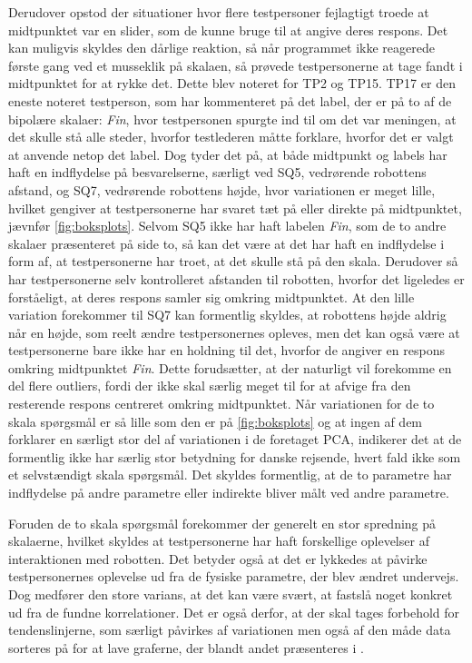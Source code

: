 Derudover opstod der situationer hvor flere testpersoner fejlagtigt troede at midtpunktet var en slider, som de kunne bruge til at angive deres respons. Det kan muligvis skyldes den dårlige reaktion, så når programmet ikke reagerede første gang ved et musseklik på skalaen, så prøvede testpersonerne at tage fandt i midtpunktet for at rykke det. Dette blev noteret for TP2 og TP15.\blankline 
%
TP17 er den eneste noteret testperson, som har kommenteret på det label, der er på to af de bipolære skalaer: \textit{Fin}, hvor testpersonen spurgte ind til om det var meningen, at det skulle stå alle steder, hvorfor testlederen måtte forklare, hvorfor det er valgt at anvende netop det label. Dog tyder det på, at både midtpunkt og labels har haft en indflydelse på besvarelserne, særligt ved SQ5, vedrørende robottens afstand, og SQ7, vedrørende robottens højde, hvor variationen er meget lille, hvilket gengiver at testpersonerne har svaret tæt på eller direkte på midtpunktet, jævnfør \autoref{fig:boksplots}. Selvom SQ5 ikke har haft labelen \textit{Fin}, som de to andre skalaer præsenteret på side to, så kan det være at det har haft en indflydelse i form af, at testpersonerne har troet, at det skulle stå på den skala. Derudover så har testpersonerne selv kontrolleret afstanden til robotten, hvorfor det ligeledes er forståeligt, at deres respons samler sig omkring midtpunktet. At den lille variation forekommer til SQ7 kan formentlig skyldes, at robottens højde aldrig når en højde, som reelt ændre testpersonernes opleves, men det kan også være at testpersonerne bare ikke har en holdning til det, hvorfor de angiver en respons omkring midtpunktet \textit{Fin}. Dette forudsætter, at der naturligt vil forekomme en del flere outliers, fordi der ikke skal særlig meget til for at afvige fra den resterende respons centreret omkring midtpunktet. Når variationen for de to skala spørgsmål er så lille som den er på \autoref{fig:boksplots} og at ingen af dem forklarer en særligt stor del af variationen i de foretaget PCA, indikerer det at de formentlig ikke har særlig stor betydning for danske rejsende, hvert fald ikke som et selvstændigt skala spørgsmål. Det skyldes formentlig, at de to parametre har indflydelse på andre parametre eller indirekte bliver målt ved andre parametre. 

Foruden de to skala spørgsmål forekommer der generelt en stor spredning på skalaerne, hvilket skyldes at testpersonerne har haft forskellige oplevelser af interaktionen med robotten. Det betyder også at det er lykkedes at påvirke testpersonernes oplevelse ud fra de fysiske parametre, der blev ændret undervejs. Dog medfører den store varians, at det kan være svært, at fastslå noget konkret ud fra de fundne korrelationer. Det er også derfor, at der skal tages forbehold for tendenslinjerne, som særligt påvirkes af variationen men også af den måde data sorteres på for at lave graferne, der blandt andet præsenteres i . 
%




